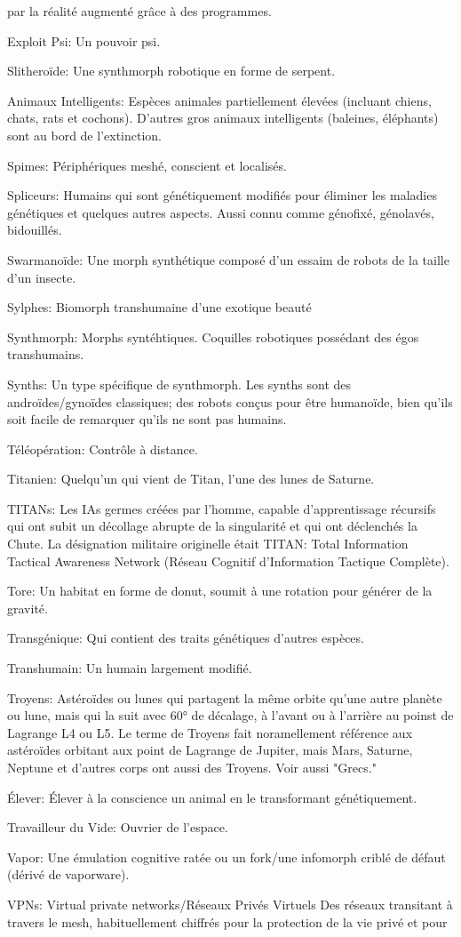 par la réalité augmenté grâce à des programmes. \item Exploit Psi: Un pouvoir psi. \item Slitheroïde: Une synthmorph robotique en forme de serpent. \item Animaux Intelligents: Espèces animales partiellement élevées (incluant chiens, chats, rats et cochons). D'autres gros animaux intelligents (baleines, éléphants) sont au bord de l'extinction. \item Spimes: Périphériques meshé, conscient et localisés. \item Spliceurs: Humains qui sont génétiquement modifiés pour éliminer les maladies génétiques et quelques autres aspects. Aussi connu comme génofixé, génolavés, bidouillés. \item Swarmanoïde: Une morph synthétique composé d'un essaim de robots de la taille d'un insecte. \item Sylphes: Biomorph transhumaine d'une exotique beauté  \item Synthmorph: Morphs syntéhtiques. Coquilles robotiques possédant des égos transhumains. \item Synths: Un type spécifique de synthmorph. Les synths sont des androïdes/gynoïdes classiques; des robots conçus pour être humanoïde, bien qu'ils soit facile de remarquer qu'ils ne sont pas humains. \item Téléopération: Contrôle à distance. \item Titanien: Quelqu'un qui vient de Titan, l'une des lunes de Saturne. \item TITANs: Les IAs germes créées par l'homme, capable d'apprentissage récursifs qui ont subit un décollage abrupte de la singularité et qui ont déclenchés la Chute. La désignation militaire originelle était TITAN: Total Information Tactical Awareness Network (Réseau Cognitif d'Information Tactique Complète). \item Tore: Un habitat en forme de donut, soumit à une rotation pour générer de la gravité. \item Transgénique: Qui contient des traits génétiques d'autres espèces. \item Transhumain: Un humain largement modifié. \item Troyens: Astéroïdes ou lunes qui partagent la même orbite qu'une autre planète ou lune, mais qui la suit avec 60° de décalage, à l'avant ou à l'arrière au poinst de Lagrange L4 ou L5. Le terme de Troyens fait noramellement référence aux astéroïdes orbitant aux point de Lagrange de Jupiter, mais Mars, Saturne, Neptune et d'autres corps ont aussi des Troyens. Voir aussi "Grecs." \item Élever: Élever à la conscience un animal en le transformant génétiquement. \item Travailleur du Vide: Ouvrier de l'espace. \item Vapor: Une émulation cognitive ratée ou un fork/une infomorph criblé de défaut (dérivé de vaporware). \item VPNs: Virtual private networks/Réseaux Privés Virtuels Des réseaux transitant à travers le mesh, habituellement chiffrés pour la protection de la vie privé et pour 